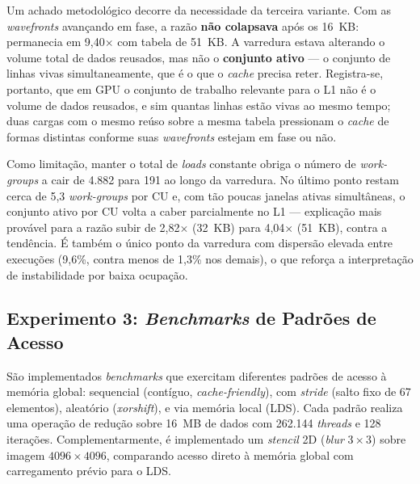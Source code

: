 Um achado metodológico decorre da necessidade da terceira variante. Com as \textit{wavefronts} avançando em fase, a razão \textbf{não colapsava} após os 16~KB: permanecia em 9,40$\times$ com tabela de 51~KB. A varredura estava alterando o volume total de dados reusados, mas não o \textbf{conjunto ativo} --- o conjunto de linhas vivas simultaneamente, que é o que o \textit{cache} precisa reter. Registra-se, portanto, que em GPU o conjunto de trabalho relevante para o L1 não é o volume de dados reusados, e sim quantas linhas estão vivas ao mesmo tempo; duas cargas com o mesmo reúso sobre a mesma tabela pressionam o \textit{cache} de formas distintas conforme suas \textit{wavefronts} estejam em fase ou não.

Como limitação, manter o total de \textit{loads} constante obriga o número de \textit{work-groups} a cair de 4.882 para 191 ao longo da varredura. No último ponto restam cerca de 5,3 \textit{work-groups} por CU e, com tão poucas janelas ativas simultâneas, o conjunto ativo por CU volta a caber parcialmente no L1 --- explicação mais provável para a razão subir de 2,82$\times$ (32~KB) para 4,04$\times$ (51~KB), contra a tendência. É também o único ponto da varredura com dispersão elevada entre execuções (9,6\%, contra menos de 1,3\% nos demais), o que reforça a interpretação de instabilidade por baixa ocupação.




\subsection{Experimento 3: \textit{Benchmarks} de Padrões de Acesso}

São implementados \textit{benchmarks} que exercitam diferentes padrões de acesso à memória global: sequencial (contíguo, \textit{cache-friendly}), com \textit{stride} (salto fixo de 67 elementos), aleatório (\textit{xorshift}), e via memória local (LDS). Cada padrão realiza uma operação de redução sobre 16~MB de dados com 262.144 \textit{threads} e 128 iterações. Complementarmente, é implementado um \textit{stencil} 2D (\textit{blur} $3\times3$) sobre imagem $4096\times4096$, comparando acesso direto à memória global com carregamento prévio para o LDS.

